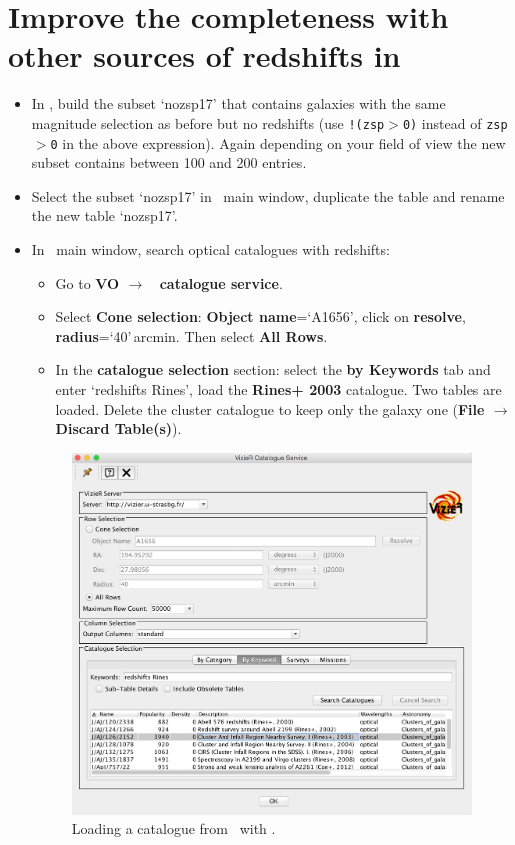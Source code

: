 \documentclass [a4paper, 12pt]{article}
\begin{document}
\section{Improve the completeness with other sources of redshifts in \vizier}

\begin{itemize}
\item In \topcat, build the subset `nozsp17' that contains galaxies with
the same magnitude selection as before but no redshifts (use
\texttt{!(zsp$>$0)}
instead of \texttt{zsp$>$0} in the above expression). Again depending on your
field of view the new subset contains between 100 and 200 entries.
\item Select the subset `nozsp17' in \topcat\ main window, duplicate the table and rename the new table `nozsp17'.
\item In \topcat\ main window, search optical catalogues with redshifts:
\begin{itemize}
    \item Go to \textbf{VO $\rightarrow$ \vizier\ catalogue service}.
    \item Select \textbf{Cone selection}: \textbf{Object name}=`A1656', click
    on \textbf{resolve}, \textbf{radius}=`40'\,arcmin. Then select \textbf{All
    Rows}.
    \item In the \textbf{catalogue selection} section: select the \textbf{by
    Keywords} tab and enter `redshifts Rines', load the \textbf{Rines+ 2003}
    catalogue. Two tables are loaded. Delete the cluster catalogue to keep only
    the galaxy one (\textbf{File $\rightarrow$ Discard Table(s)}).
\end{itemize}

\begin{figure}[H]
\center
\includegraphics[width=0.5  \textwidth]{../images/topcat_vizier_rines2003.jpg}
\caption{Loading a catalogue from \vizier\ with \topcat.}
\label{fig:topcatvizier}
\end{figure}


\end{itemize}
\end{document}
